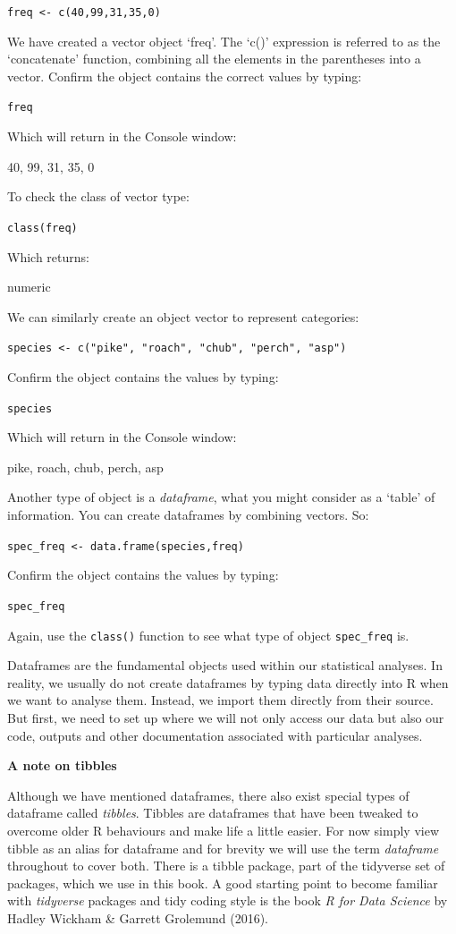\documentclass[
]{book}
\begin{document}
\texttt{freq\ \textless{}-\ c(40,99,31,35,0)}

We have created a vector object `freq'. The `c()' expression is referred to as the `concatenate' function, combining all the elements in the parentheses into a vector. Confirm the object contains the correct values by typing:

\texttt{freq}

Which will return in the Console window:

40, 99, 31, 35, 0

To check the class of vector type:

\texttt{class(freq)}

Which returns:

numeric

We can similarly create an object vector to represent categories:

\texttt{species\ \textless{}-\ c("pike",\ "roach",\ "chub",\ "perch",\ "asp")}

Confirm the object contains the values by typing:

\texttt{species}

Which will return in the Console window:

pike, roach, chub, perch, asp

Another type of object is a \emph{dataframe}, what you might consider as a `table' of information. You can create dataframes by combining vectors. So:

\texttt{spec\_freq\ \textless{}-\ data.frame(species,freq)}

Confirm the object contains the values by typing:

\texttt{spec\_freq}

Again, use the \texttt{class()} function to see what type of object \texttt{spec\_freq} is.

Dataframes are the fundamental objects used within our statistical analyses. In reality, we usually do not create dataframes by typing data directly into R when we want to analyse them. Instead, we import them directly from their source. But first, we need to set up where we will not only access our data but also our code, outputs and other documentation associated with particular analyses.

\textbf{A note on tibbles}

Although we have mentioned dataframes, there also exist special types of dataframe called \emph{tibbles}. Tibbles are dataframes that have been tweaked to overcome older R behaviours and make life a little easier. For now simply view tibble as an alias for dataframe and for brevity we will use the term \emph{dataframe} throughout to cover both. There is a tibble package, part of the tidyverse set of packages, which we use in this book. A good starting point to become familiar with \emph{tidyverse} packages and tidy coding style is the book \emph{R for Data Science} by Hadley Wickham \& Garrett Grolemund (2016).
\end{document}
